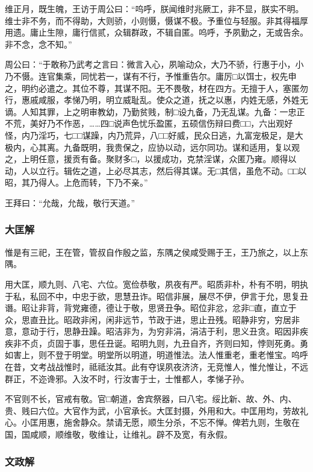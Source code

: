 \documentclass[]{article}
\begin{document}
维正月，既生魄，王访于周公曰：``呜呼，朕闻维时兆厥工，非不显，朕实不明。维士非不务，而不得助，大则骄，小则慑，慑谋不极。予重位与轻服。非其得福厚用遗。庸止生隙，庸行信贰，众辑群政，不辑自匿。呜呼，予夙勤之，无或告余。非不念，念不知。''

周公曰：``于敢称乃武考之言曰：微言入心，夙喻动众，大乃不骄，行惠于小，小乃不慑。连官集乘，同忧若一，谋有不行，予惟重告尔。庸厉□以饵士，权先申之，明约必遣之。其位不尊，其谋不阳。无不畏敬，材在四方。无擅于人，塞匿勿行，惠戚咸服，孝悌乃明，明立威耻乱。使众之道，抚之以惠，内姓无感，外姓无谪。人知其罪，上之明审教幼，乃勤贫贱，制□设九备，乃无乱谋。九备：一忠正不荒，美好乃不作恶，\ldots{}\ldots{}四□说声色忧乐盈匿，五硕信伤辩曰费□□，六出观好怪，内乃淫巧，七□□谋躁，内乃荒异，八□□好威，民众日逃，九富宠极足，是大极内，心其离。九备既明，我贵保之，应协以动，远尔同功。谋和适用，复以观之，上明任意，援贡有备。聚财多□，以援成功，克禁淫谋，众匿乃雍。顺得以动，人以立行。辑佐之道，上必尽其志，然后得其谋。无□其信，虽危不动。□□以昭，其乃得人。上危而转，下乃不亲。''

王拜曰：``允哉，允哉，敬行天道。''

\hypertarget{header-n203}{%
\subsubsection{大匡解}\label{header-n203}}

惟是有三祀，王在管，管叔自作殷之监，东隅之侯咸受赐于王，王乃旅之，以上东隅。

用大匡，顺九则、八宅、六位。宽俭恭敬，夙夜有严。昭质非朴，朴有不明，明执于私，私回不中，中忠于欲，思慧丑诈。昭信非展，展尽不伊，伊言于允，思复丑谮。昭让非背，背党雍德，德让于敬，思贤丑争。昭位非忿，忿非□直，直立于众，思直丑比。昭政非闲，闲非远节，节政于进，思止丑残。昭静非穷，穷居非意，意动于行，思静丑躁。昭洁非为，为穷非涓，涓洁于利，思义丑贪。昭因非疾疾非不贞，贞固于事，思任丑诞。昭明九则，九丑自齐，齐则曰知，悖则死勇。勇如害上，则不登于明堂。明堂所以明道，明道惟法。法人惟重老，重老惟宝。呜呼在昔，文考战战惟时，祗祗汝其。此有夺误夙夜济济，无竞惟人，惟允惟让，不远群正，不迩谗邪。入汝不时，行汝害于士，士惟都人，孝悌子孙。

不官则不长，官戒有敬。官□朝道，舍宾祭器，曰八宅。绥比新、故、外、内、贵、贱曰六位。大官作为武，小官承长。大匡封摄，外用和大。中匡用均，劳故礼心。小匡用惠，施舍静众。禁请无愿，顺生分杀，不忘不惮。俾若九则，生敬在国，国咸顺，顺维敬，敬维让，让维礼。辟不及宽，有永假。

\hypertarget{header-n207}{%
\subsubsection{文政解}\label{header-n207}}
\end{document}
